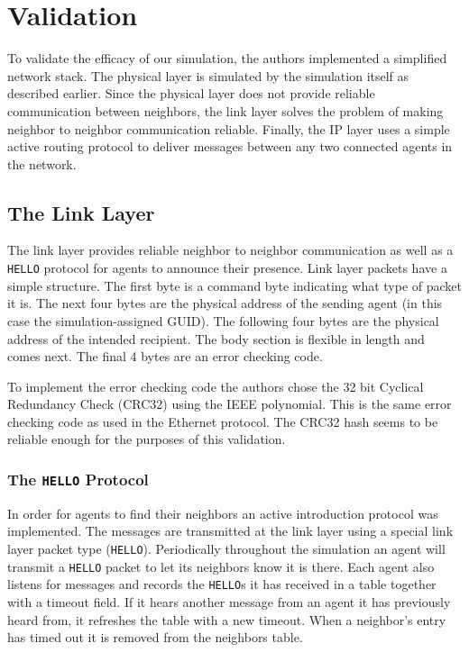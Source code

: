 \section{Validation}

To validate the efficacy of our simulation, the authors implemented a simplified network stack. The
physical layer is simulated by the simulation itself as described earlier. Since the physical layer
does not provide reliable communication between neighbors, the link layer solves the problem of
making neighbor to neighbor communication reliable. Finally, the IP layer uses a simple active
routing protocol to deliver messages between any two connected agents in the network.

\subsection{The Link Layer}

The link layer provides reliable neighbor to neighbor communication as well as a \texttt{HELLO}
protocol for agents to announce their presence. Link layer packets have a simple structure. The
first byte is a command byte indicating what type of packet it is. The next four bytes are the
physical address of the sending agent (in this case the simulation-assigned GUID). The following
four bytes are the physical address of the intended recipient. The body section is flexible in
length and comes next. The final 4 bytes are an error checking code.

To implement the error checking code the authors chose the 32 bit Cyclical Redundancy Check (CRC32)
using the IEEE polynomial. This is the same error checking code as used in the Ethernet protocol.
The CRC32 hash seems to be reliable enough for the purposes of this validation. 

\subsubsection{The \texttt{HELLO} Protocol}

In order for agents to find their neighbors an active introduction protocol was implemented. The
messages are transmitted at the link layer using a special link layer packet type (\texttt{HELLO}).
Periodically throughout the simulation an agent will transmit a \texttt{HELLO} packet to let its
neighbors know it is there. Each agent also listens for messages and records the \texttt{HELLO}s it
has received in a table together with a timeout field. If it hears another message from an agent it
has previously heard from, it refreshes the table with a new timeout. When a neighbor's entry has
timed out it is removed from the neighbors table.

